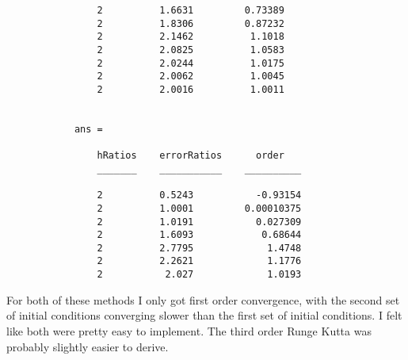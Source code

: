 \documentclass[11pt, oneside, titlepage]{article}
\begin{document}
\begin{enumerate}
\begin{verbatim}
                2          1.6631         0.73389
                2          1.8306         0.87232
                2          2.1462          1.1018
                2          2.0825          1.0583
                2          2.0244          1.0175
                2          2.0062          1.0045
                2          2.0016          1.0011


            ans = 

                hRatios    errorRatios      order   
                _______    ___________    __________

                2          0.5243           -0.93154
                2          1.0001         0.00010375
                2          1.0191           0.027309
                2          1.6093            0.68644
                2          2.7795             1.4748
                2          2.2621             1.1776
                2           2.027             1.0193           
        \end{verbatim}

        For both of these methods I only got first order convergence, with the
        second set of initial conditions converging slower than the first set of
        initial conditions.
        I felt like both were pretty easy to implement.
        The third order Runge Kutta was probably slightly easier to derive.
\end{enumerate}
\end{document}
